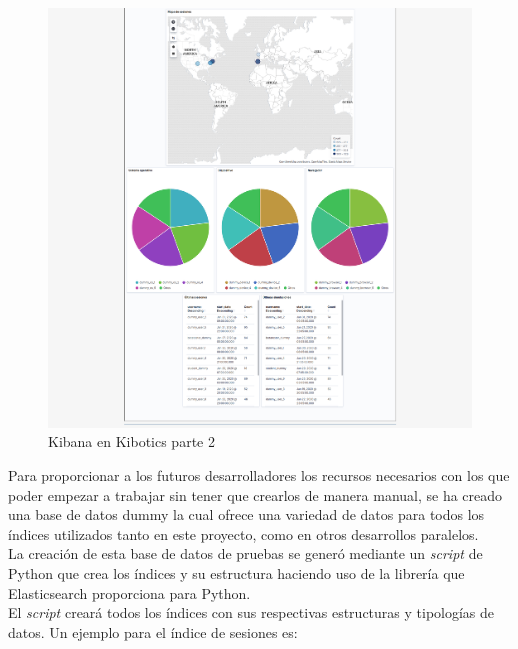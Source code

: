 \documentclass[a4paper, 12pt]{book}
\begin{document}
		\begin{figure}[H]
			\centering
			\includegraphics[width=15cm, keepaspectratio]{img/kibana_kibotics_02.png}
			\caption{Kibana en Kibotics parte 2}
			\label{fig:kibana_kibotics_02}
		\end{figure}
		

		Para proporcionar a los futuros desarrolladores los recursos necesarios con los que poder empezar a trabajar sin tener que crearlos de manera manual, se ha creado una base de datos dummy la cual ofrece una variedad de datos para todos los índices utilizados tanto en este proyecto, como en otros desarrollos paralelos.\\

		La creación de esta base de datos de pruebas se generó mediante un \textit{script} de Python que crea los índices y su estructura haciendo uso de la librería que Elasticsearch proporciona para Python.\\
		
		El \textit{script} creará todos los índices con sus respectivas estructuras y tipologías de datos. Un ejemplo para el índice de sesiones es:
		
\end{document}
